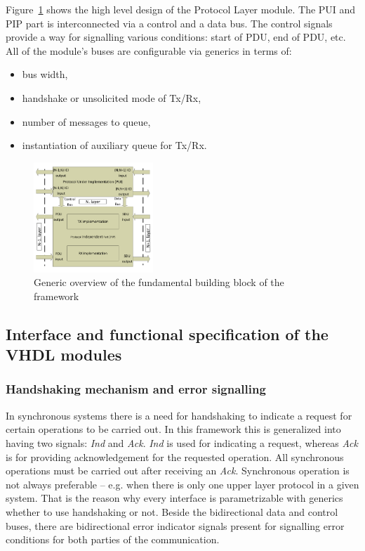 \documentclass[conference]{IEEEtran}
\begin{document}
Figure~\ref{fig:system_sketch} shows the high level design of the Protocol Layer module. The PUI and PIP part is
interconnected via a control and a data bus. The control signals provide a way for signalling various conditions: start
of PDU, end of PDU, etc. All of the module's buses are configurable via generics in terms of:
\begin{itemize}
    \renewcommand \labelitemi{--}
    \item bus width,
    \item handshake or unsolicited mode of Tx/Rx,
    \item number of messages to queue,
    \item instantiation of auxiliary queue for Tx/Rx.
\end{itemize}

\begin{figure}[!htb]
    \centering
    \includegraphics[width=0.4\textwidth]{figures_raw/system_sketch.pdf}
    \caption{Generic overview of the fundamental building block of the framework}
    \label{fig:system_sketch}
\end{figure}

\subsection{Interface and functional specification of the VHDL modules}\label{subsec:if_and_func_spec_VHDL}

\subsubsection{Handshaking mechanism and error signalling}
In synchronous systems there is a need for handshaking to indicate a request for certain operations to be carried out.
In this framework this is generalized into having two signals: \emph{Ind} and \emph{Ack}.
\emph{Ind} is used for indicating a request, whereas \emph{Ack} is for providing acknowledgement for
the requested operation. All synchronous operations must be carried out after receiving an \emph{Ack}.
Synchronous operation is not always preferable -- e.g. when there is only one upper layer protocol in a
given system. That is the reason why every interface is parametrizable with generics whether to use
handshaking or not.
Beside the bidirectional data and control buses, there are bidirectional error indicator signals present
for signalling error conditions for both parties of the communication.
\end{document}
